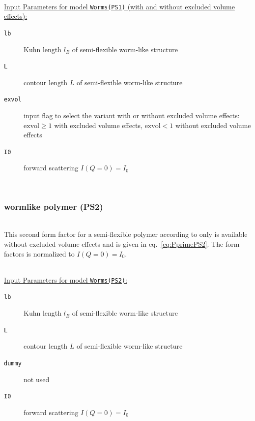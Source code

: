 \vspace{5mm}

\hspace{1pt}\\
\uline{Input Parameters for model \texttt{Worms(PS1)} (with and without excluded volume effects):}\\
\begin{description}
\item[\texttt{lb}] Kuhn length $l_B$ of semi-flexible worm-like structure
\item[\texttt{L}] contour length $L$ of semi-flexible worm-like structure
\item[\texttt{exvol}] input flag to select the variant with or without excluded volume effects: $\mathrm{exvol} \geq 1$ with excluded volume effects, $\mathrm{exvol} < 1$ without excluded volume effects
\item[\texttt{I0}] forward scattering $I(Q=0)=I_0$
\end{description}

\vphantom{.}~\\

\subsubsection{wormlike polymer (PS2)}
\label{sect:ffWorm(PS2)}
~\\
This second form factor for a semi-flexible polymer  according to \cite{Pedersen96Macrom} only is available without excluded volume effects and is given in eq.\ \ref{eq:PprimePS2}. The form factors is normalized to $I(Q=0)=I_0$.

\vspace{5mm}

\hspace{1pt}\\
\uline{Input Parameters for model \texttt{Worms(PS2)}:}\\
\begin{description}
\item[\texttt{lb}] Kuhn length $l_B$ of semi-flexible worm-like structure
\item[\texttt{L}] contour length $L$ of semi-flexible worm-like structure
\item[\texttt{dummy}] not used
\item[\texttt{I0}] forward scattering $I(Q=0)=I_0$
\end{description}

\vphantom{.}~\\

